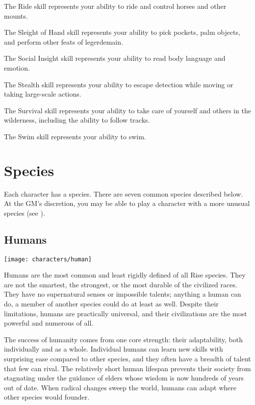 \begin{raggeditemize}
        \item The Ride skill represents your ability to ride and control horses and other mounts.
        \item The Sleight of Hand skill represents your ability to pick pockets, palm objects, and perform other feats of legerdemain.
        \item The Social Insight skill represents your ability to read body language and emotion.
        \item The Stealth skill represents your ability to escape detection while moving or taking large-scale actions.
        \item The Survival skill represents your ability to take care of yourself and others in the wilderness, including the ability to follow tracks.
        \item The Swim skill represents your ability to swim.
    \end{raggeditemize}

\section{Species}\label{Species}
    Each character has a species.
    There are seven common species described below.
    At the GM's discretion, you may be able to play a character with a more unusual species (see ).

    \subsection{Humans}
        \texttt{[image: characters/human]}

        Humans are the most common and least rigidly defined of all Rise species.
        They are not the smartest, the strongest, or the most durable of the civilized races.
        They have no supernatural senses or impossible talents; anything a human can do, a member of another species could do at least as well.
        Despite their limitations, humans are practically universal, and their civilizations are the most powerful and numerous of all.

        The success of humanity comes from one core strength: their adaptability, both individually and as a whole.
        Individual humans can learn new skills with surprising ease compared to other species, and they often have a breadth of talent that few can rival.
        The relatively short human lifespan prevents their society from stagnating under the guidance of elders whose wisdom is now hundreds of years out of date.
        When radical changes sweep the world, humans can adapt where other species would founder.

